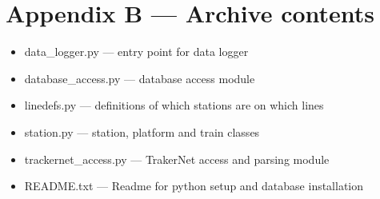 \documentclass[a4paper,12pt]{article}
\begin{document}


\section*{Appendix B --- Archive contents}

\begin{itemize}
  \item data\_logger.py --- entry point for data logger
  \item database\_access.py --- database access module
  \item linedefs.py --- definitions of which stations are on which lines
  \item station.py --- station, platform and train classes
  \item trackernet\_access.py --- TrakerNet access and parsing module
  \item README.txt --- Readme for python setup and database installation
\end{itemize}
\end{document}
